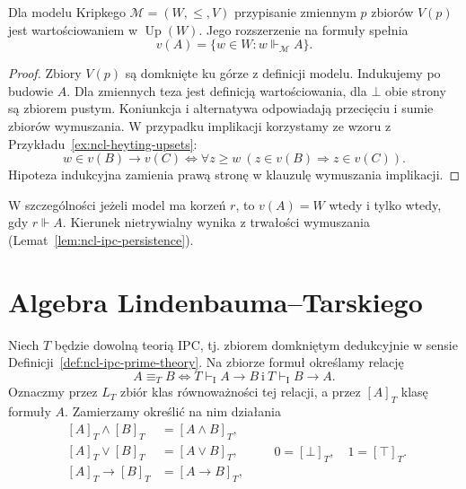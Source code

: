 \begin{stwierdzenie}
\label{prop:ncl-heyting-kripke-valuation}
Dla modelu Kripkego $\mathcal M=(W,\leq,V)$
przypisanie zmiennym $p$ zbiorów $V(p)$
jest wartościowaniem w $\operatorname{Up}(W)$.
Jego rozszerzenie na formuły spełnia
\[
 v(A)=\{w\in W:w\Vdash_{\mathcal M}A\}.
\]
\end{stwierdzenie}
\begin{proof}
Zbiory $V(p)$ są domknięte ku górze z definicji
modelu. Indukujemy po budowie $A$.
Dla zmiennych teza jest definicją wartościowania,
dla $\bot$ obie strony są zbiorem pustym.
Koniunkcja i alternatywa odpowiadają przecięciu
i sumie zbiorów wymuszania.
W przypadku implikacji korzystamy ze wzoru
z Przykładu~\ref{ex:ncl-heyting-upsets}:
\[
 w\in v(B)\to v(C)
 \iff \forall z\geq w\
 (z\in v(B)\Longrightarrow z\in v(C)).
\]
Hipoteza indukcyjna zamienia prawą stronę
w klauzulę wymuszania implikacji.
\end{proof}
W szczególności jeżeli model ma korzeń $r$,
to $v(A)=W$ wtedy i tylko wtedy, gdy $r\Vdash A$.
Kierunek nietrywialny wynika z trwałości
wymuszania (Lemat~\ref{lem:ncl-ipc-persistence}).

\section{Algebra Lindenbauma--Tarskiego}

\begin{definicja}
\label{def:ncl-heyting-lindenbaum}
Niech $T$ będzie dowolną teorią IPC, tj. zbiorem
domkniętym dedukcyjnie w sensie
Definicji~\ref{def:ncl-ipc-prime-theory}.
Na zbiorze formuł określamy relację
\[
 A\equiv_T B
 \iff T\vdash_{\mathrm I}A\to B
       \ \text{i}\ T\vdash_{\mathrm I}B\to A.
\]
Oznaczmy przez $L_T$ zbiór klas równoważności
tej relacji, a przez $[A]_T$ klasę formuły $A$.
Zamierzamy określić na nim działania
\[
\begin{aligned}
 [A]_T\wedge[B]_T&=[A\wedge B]_T,\\
 [A]_T\vee[B]_T&=[A\vee B]_T,\\
 [A]_T\to[B]_T&=[A\to B]_T,
\end{aligned}
\qquad 0=[\bot]_T,\quad 1=[\top]_T.
\]
\end{definicja}

